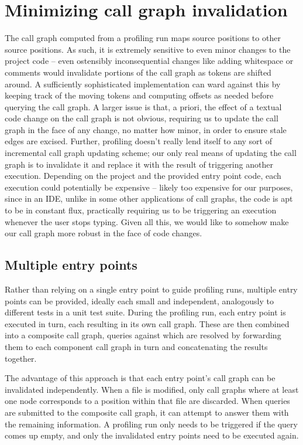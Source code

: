 \section{Minimizing call graph invalidation}

The call graph computed from a profiling run maps source positions to other
source positions. As such, it is extremely sensitive to even minor changes to
the project code -- even ostensibly inconsequential changes like adding
whitespace or comments would invalidate portions of the call graph as tokens
are shifted around. A sufficiently sophisticated implementation can ward
against this by keeping track of the moving tokens and computing offsets as
needed before querying the call graph. A larger issue is that, a priori, the
effect of a textual code change on the call graph is not obvious, requiring us
to update the call graph in the face of any change, no matter how minor, in
order to ensure stale edges are excised. Further, profiling doesn't really lend
itself to any sort of incremental call graph updating scheme; our only real
means of updating the call graph is to invalidate it and replace it with the
result of triggering another execution. Depending on the project and the
provided entry point code, each execution could potentially be expensive --
likely too expensive for our purposes, since in an IDE, unlike in some other
applications of call graphs, the code is apt to be in constant flux,
practically requiring us to be triggering an execution whenever the user stops
typing. Given all this, we would like to somehow make our call graph more
robust in the face of code changes.

\subsection{Multiple entry points}

Rather than relying on a single entry point to guide profiling runs, multiple
entry points can be provided, ideally each small and independent, analogously
to different tests in a unit test suite. During the profiling run, each entry
point is executed in turn, each resulting in its own call graph. These are then
combined into a composite call graph, queries against which are resolved by
forwarding them to each component call graph in turn and concatenating the
results together.

The advantage of this approach is that each entry point's call graph can be
invalidated independently. When a file is modified, only call graphs where at
least one node corresponds to a position within that file are discarded. When
queries are submitted to the composite call graph, it can attempt to answer
them with the remaining information. A profiling run only needs to be triggered
if the query comes up empty, and only the invalidated entry points need to be
executed again.

